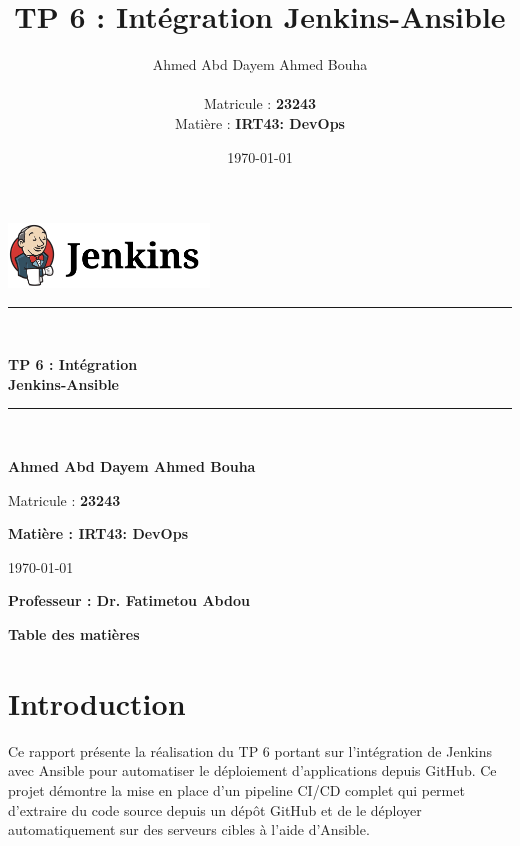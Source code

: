 \documentclass{article}
\title{\Huge{\textbf{TP 6 : Intégration Jenkins-Ansible}}}
\author{\Large{Ahmed Abd Dayem Ahmed Bouha} \\ \\ \large{Matricule : \textbf{23243}} \\ \vspace{2cm} \large{Matière : \textbf{IRT43: DevOps}}}
\date{\today}
\begin{document}
\begin{titlepage}
    \centering
    \vspace*{1cm}
    
    \includegraphics[width=0.4\textwidth]{images/jenkins_logo.png}\\[1cm]
    
    \rule{\linewidth}{0.5mm} \\[0.5cm]
    {\Huge\bfseries\color{deepblue} TP 6 : Intégration\\Jenkins-Ansible\par}
    \rule{\linewidth}{0.5mm} \\[1.5cm]
    
    {\LARGE\bfseries Ahmed Abd Dayem Ahmed Bouha\par}
    \vspace{0.5cm}
    {\large Matricule : \textbf{23243}\par}
    \vspace{1.5cm}
    {\large\bfseries Matière : \textbf{IRT43: DevOps}\par}
    \vspace{1.5cm}
    {\large\today\par}
    \vfill
    
    \begin{flushright}
    {\LARGE\bfseries Professeur : Dr. Fatimetou Abdou\par}
    \end{flushright}
    
    \vspace{1cm}
\end{titlepage}

\thispagestyle{empty}
\begin{center}
\Large{\textbf{Table des matières}}
\end{center}
\tableofcontents
\thispagestyle{empty}
\newpage

\setcounter{page}{1}
\section{Introduction}
Ce rapport présente la réalisation du TP 6 portant sur l'intégration de Jenkins avec Ansible pour automatiser le déploiement d'applications depuis GitHub. Ce projet démontre la mise en place d'un pipeline CI/CD complet qui permet d'extraire du code source depuis un dépôt GitHub et de le déployer automatiquement sur des serveurs cibles à l'aide d'Ansible.
\end{document}
